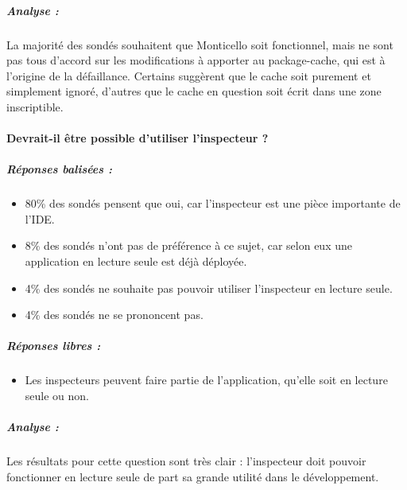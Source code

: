 \subparagraph{Analyse :}
La majorité des sondés souhaitent que Monticello soit fonctionnel, mais ne sont pas tous d'accord sur les modifications à apporter au package-cache, qui est à l'origine de la défaillance. Certains suggèrent que le cache soit purement et simplement ignoré, d'autres que le cache en question soit écrit dans une zone inscriptible.

\paragraph{Devrait-il être possible d'utiliser l'inspecteur ?}
\subparagraph{Réponses balisées :}
\begin{itemize}
	\item 80\% des sondés pensent que oui, car l'inspecteur est une pièce importante de l'IDE.
	\item 8\% des sondés n'ont pas de préférence à ce sujet, car selon eux une application en lecture seule est déjà déployée.
	\item 4\% des sondés ne souhaite pas pouvoir utiliser l'inspecteur en lecture seule.
	\item 4\% des sondés ne se prononcent pas.
\end{itemize}

\subparagraph{Réponses libres :}
\begin{itemize}
	\item Les inspecteurs peuvent faire partie de l'application, qu'elle soit en lecture seule ou non.
\end{itemize}

\subparagraph{Analyse :}
Les résultats pour cette question sont très clair : l'inspecteur doit pouvoir fonctionner en lecture seule de part sa grande utilité dans le développement.
